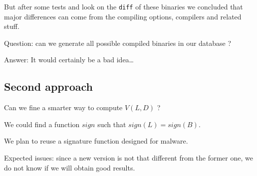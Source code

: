 \documentclass{article}
\newcommand{\signature}{{sign}}
\begin{document}
    But after some tests and look on the \verb|diff| of these binaries we
    concluded that major differences can come from the compiling options,
    compilers and related stuff.

    Question: can we generate all possible compiled binaries in our database ? 
    
    Answer: It would certainly be a bad idea\dots

    \subsection{Second approach}
    Can we fine a smarter way to compute $V(L,D)$ ?

    We could find a function $\signature$ such that $\signature(L) =
    \signature(B)$.

    We plan to reuse a signature function designed for malware.

    Expected issues: since a new version is not that different from the former
    one, we do not know if we will obtain good results.
\end{document}
